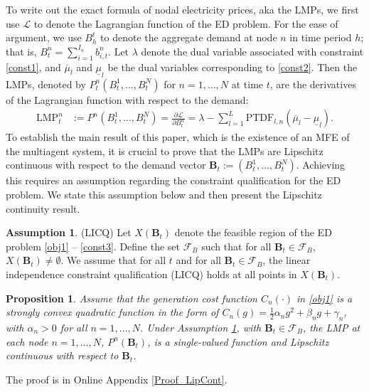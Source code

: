 \documentclass{article}
\theoremstyle{definition}
\newtheorem{assumption}{Assumption}
\theoremstyle{plain}
\newtheorem{proposition}{Proposition}
\begin{document}
To write out the exact formula of nodal electricity prices, aka the LMPs, we first  use $\mathcal{L}$ to denote the Lagrangian function of the ED problem. For the ease of argument, we use $B^t_h$ to denote the aggregate demand at node $n$ in time period $h$; that is, $B^n_t =  \sum_{i=1}^{I_n}b^n_{i,t}$. 
Let $\lambda$ denote the dual variable associated with constraint \eqref{const1}, and $\overline{\mu}_l$ and $\underline{\mu}_l$ be the dual variables corresponding to  \eqref{const2}. Then the LMPs, denoted by $P^n_t(B^1_{t},\dots, B^{N}_{t})$ for $n = 1, \ldots, {N}$ at time $t$,  are the derivatives of the Lagrangian function with respect to the demand: 
\begin{align}
\label{LMP} 
\mathrm{LMP}^n_{t} & :=  P^n(B^1_{t},\dots,B^{N}_{t}) = \frac{\partial \mathcal{L}}{\partial B^n_{t}} 
= \lambda - \sum_{l=1}^L \mathrm{PTDF}_{l, n} (\overline{\mu}_l - \underline{\mu}_l).
\end{align} 
To establish the main result of this paper, which is the existence of an MFE of the multiagent system, it is crucial to prove that the LMPs are Lipschitz continuous with respect to the demand vector $\mathbf{B}_t := (B^1_t, \dots, B^{N}_t)$. Achieving this requires an assumption regarding the constraint qualification for the ED problem. We state this assumption below and then present the Lipschitz continuity result.
\begin{assumption}
	\label{assump:LICQ} 
	(LICQ) Let \(X(\mathbf{B}_t)\) denote the feasible region of the ED problem \eqref{obj1} -- \eqref{const3}. Define the set \(\mathcal{F}_B\) such that for all \(\mathbf{B}_t \in \mathcal{F}_B\), \(X(\mathbf{B}_t) \neq \emptyset\). We assume that for all \(t\) and for all \(\mathbf{B}_t \in \mathcal{F}_B\), the linear independence constraint qualification (LICQ) holds at all points in \(X(\mathbf{B}_t)\).
	
\end{assumption}
\begin{proposition} \label{prop:LMP_LipCont}
	Assume that the generation cost function $C_n(\cdot)$ in \eqref{obj1} is a strongly convex quadratic function in the form of $C_n(g) = \frac{1}{2}\alpha_n g^2 + \beta_n g + \gamma_n$, with $\alpha_n > 0$  for all $n = 1, \ldots, N$. 
	Under Assumption \ref{assump:LICQ}, with $\mathbf{B}_t\in\mathcal{F}_B$, the LMP at each node $n =1, \ldots, N$, $P^n(\mathbf{B}_t)$, is a single-valued function and Lipschitz continuous with respect to $\mathbf{B}_t$.
\end{proposition}
The proof is in Online Appendix \ref{Proof_LipCont}.
\end{document}
